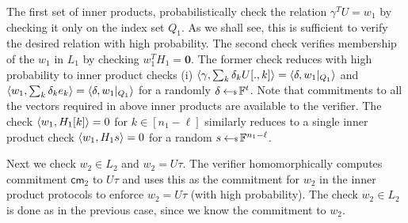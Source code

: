 The first set of inner products, probabilistically check the relation
$\gamma^TU=w_1$ by checking it only on the index set $Q_1$. As we shall see,
this is sufficient to verify the desired relation with high probability. The
second check verifies membership of the $w_1$ in $L_1$ by checking
$w_1^TH_1=\bm{0}$. The former check reduces with high probability to inner
product checks (i) $\langle \gamma,\sum_k
\delta_kU[.,k]\rangle=\langle \delta,w_1|_{Q_1}\rangle$ and
$\langle w_1,\sum_k\delta_ke_k\rangle=\langle \delta,w_1|_{Q_1}\rangle$ for a randomly
$\delta\hskip2.3pt{\gets\!\!\mbox{\tiny${\$}$\normalsize}}\, \mathbb{F}^t$. Note that
commitments to all the vectors required in above inner products are available
to the verifier. The check $\langle w_1,H_1[k]\rangle=0$ for $k\in [n_1-\ell]$
similarly reduces to a single inner product check $\langle w_1,H_1s\rangle=0$ for a
random $s\hskip2.3pt{\gets\!\!\mbox{\tiny${\$}$\normalsize}}\, \mathbb{F}^{n_1-\ell}$. 

Next we check $w_2\in L_2$ and $w_2=U\tau$. The verifier homomorphically
computes commitment $\mathsf{cm}_2$ to $U\tau$ and uses this as the commitment
for $w_2$ in the inner product protocols to enforce $w_2=U\tau$ (with high
probability). The check $w_2\in L_2$ is done as in the previous case, since we
know the commitment to $w_2$.

